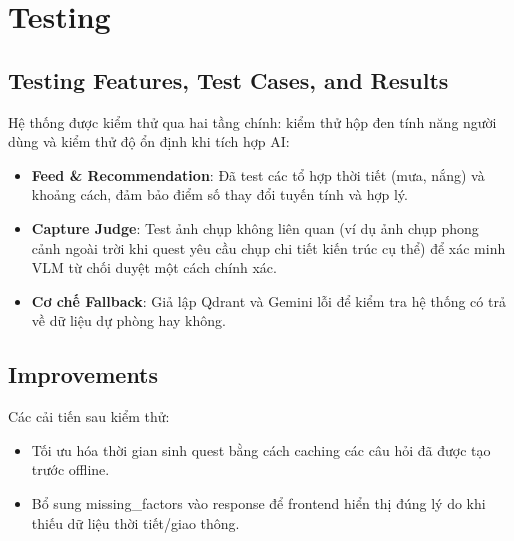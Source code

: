 \section{Testing}

\subsection{Testing Features, Test Cases, and Results}

Hệ thống được kiểm thử qua hai tầng chính: kiểm thử hộp đen tính năng người dùng và kiểm thử độ ổn định khi tích hợp AI:
\begin{itemize}
    \item \textbf{Feed \& Recommendation}: Đã test các tổ hợp thời tiết (mưa, nắng) và khoảng cách, đảm bảo điểm số thay đổi tuyến tính và hợp lý.
    \item \textbf{Capture Judge}: Test ảnh chụp không liên quan (ví dụ ảnh chụp phong cảnh ngoài trời khi quest yêu cầu chụp chi tiết kiến trúc cụ thể) để xác minh VLM từ chối duyệt một cách chính xác.
    \item \textbf{Cơ chế Fallback}: Giả lập Qdrant và Gemini lỗi để kiểm tra hệ thống có trả về dữ liệu dự phòng hay không.
\end{itemize}



\subsection{Improvements}

Các cải tiến sau kiểm thử:
\begin{itemize}
    \item Tối ưu hóa thời gian sinh quest bằng cách caching các câu hỏi đã được tạo trước offline.
    \item Bổ sung missing\_factors vào response để frontend hiển thị đúng lý do khi thiếu dữ liệu thời tiết/giao thông.
\end{itemize}

